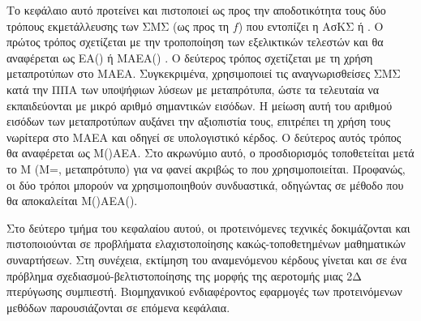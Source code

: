Το κεφάλαιο αυτό προτείνει και πιστοποιεί ως προς την αποδοτικότητα τους δύο τρόπους εκμετάλλευσης των ΣΜΣ (ως προς τη $f$) που εντοπίζει η ΑσΚΣ ή . Ο πρώτος τρόπος σχετίζεται με την τροποποίηση των εξελικτικών τελεστών και θα αναφέρεται ως ΕΑ() ή ΜΑΕΑ() \cite{LTT_2_054}. Ο δεύτερος τρόπος σχετίζεται με τη χρήση μεταπροτύπων στο ΜΑΕΑ. Συγκεκριμένα, χρησιμοποιεί τις αναγνωρισθείσες ΣΜΣ κατά την ΠΠΑ των υποψήφιων λύσεων με μεταπρότυπα, ώστε τα τελευταία να εκπαιδεύονται με μικρό αριθμό σημαντικών εισόδων. Η μείωση αυτή του αριθμού εισόδων των μεταπροτύπων αυξάνει την αξιοπιστία τους, επιτρέπει τη χρήση τους νωρίτερα στο ΜΑΕΑ και οδηγεί σε υπολογιστικό κέρδος. Ο δεύτερος αυτός τρόπος θα αναφέρεται ως Μ()ΑΕΑ. Στο ακρωνύμιο αυτό, ο προσδιορισμός  τοποθετείται μετά το Μ (Μ=, μεταπρότυπο) για να φανεί ακριβώς το που χρησιμοποιείται. Προφανώς, οι δύο τρόποι μπορούν να χρησιμοποιηθούν συνδυαστικά, οδηγώντας σε μέθοδο που θα αποκαλείται Μ()ΑΕΑ().

Στο δεύτερο τμήμα του κεφαλαίου αυτού, οι προτεινόμενες τεχνικές δοκιμάζονται και πιστοποιούνται σε προβλήματα ελαχιστοποίησης κακώς-τοποθετημένων μαθηματικών συναρτήσεων. Στη συνέχεια, εκτίμηση του αναμενόμενου κέρδους γίνεται και σε ένα πρόβλημα σχεδιασμού-βελτιστοποίησης της μορφής της αεροτομής μιας 2Δ πτερύγωσης συμπιεστή. Βιομηχανικού ενδιαφέροντος εφαρμογές των προτεινόμενων μεθόδων παρουσιάζονται σε επόμενα κεφάλαια.             

 

    
